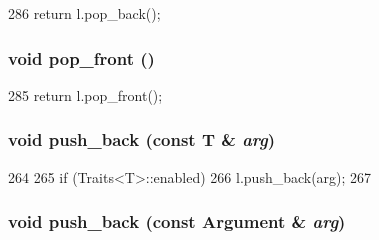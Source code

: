 \begin{DoxyCode}
286 { return l.pop_back(); }
\end{DoxyCode}
\hypertarget{classVarArgs_1_1List_a56f4ffbc6fd414b3c02a6c368e99594f}{
\subsubsection[{pop\_\-front}]{\setlength{\rightskip}{0pt plus 5cm}void pop\_\-front ()}}
\label{classVarArgs_1_1List_a56f4ffbc6fd414b3c02a6c368e99594f}



\begin{DoxyCode}
285 { return l.pop_front(); }
\end{DoxyCode}
\hypertarget{classVarArgs_1_1List_a9281cd0534a6a207cc53f85d6383da09}{
\subsubsection[{push\_\-back}]{\setlength{\rightskip}{0pt plus 5cm}void push\_\-back (const T \& {\em arg})}}
\label{classVarArgs_1_1List_a9281cd0534a6a207cc53f85d6383da09}



\begin{DoxyCode}
264     {
265         if (Traits<T>::enabled)
266             l.push_back(arg);
267     }
\end{DoxyCode}
\hypertarget{classVarArgs_1_1List_acee53453c89b2b3e4acb03896bc4d552}{
\subsubsection[{push\_\-back}]{\setlength{\rightskip}{0pt plus 5cm}void push\_\-back (const {\bf Argument} \& {\em arg})}}
\label{classVarArgs_1_1List_acee53453c89b2b3e4acb03896bc4d552}



